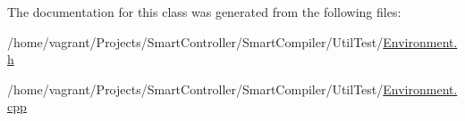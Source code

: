 The documentation for this class was generated from the following files\+:\begin{DoxyCompactItemize}
\item 
/home/vagrant/\+Projects/\+Smart\+Controller/\+Smart\+Compiler/\+Util\+Test/\hyperlink{_environment_8h}{Environment.\+h}\item 
/home/vagrant/\+Projects/\+Smart\+Controller/\+Smart\+Compiler/\+Util\+Test/\hyperlink{_environment_8cpp}{Environment.\+cpp}\end{DoxyCompactItemize}
